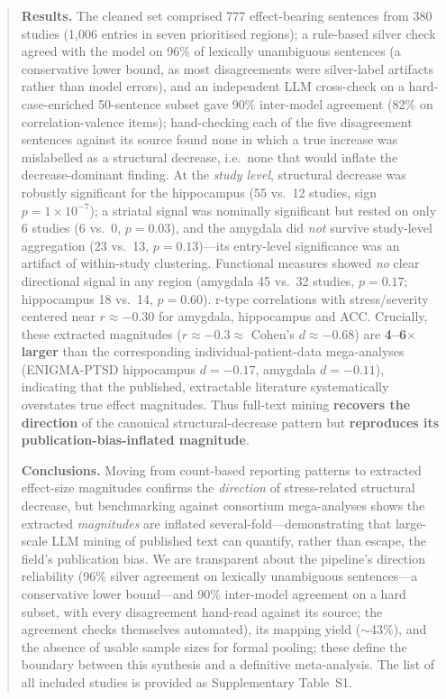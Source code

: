 \documentclass[11pt]{article}
\begin{document}
\begin{abstract}
\textbf{Results.} The cleaned set comprised 777 effect-bearing sentences from 380
studies (1{,}006 entries in seven prioritised regions); a rule-based silver check agreed with
the model on 96\% of lexically unambiguous sentences (a conservative lower bound,
as most disagreements were silver-label artifacts rather than model errors), and
an independent LLM cross-check on a hard-case-enriched 50-sentence subset gave
90\% inter-model agreement (82\% on correlation-valence items); hand-checking each
of the five disagreement sentences against its source found none in which a true
increase was mislabelled as a structural decrease, i.e.\ none that would inflate
the decrease-dominant finding. At the \emph{study level}, structural decrease was
robustly significant for the hippocampus (55 vs.\ 12 studies, sign
$p=1\times10^{-7}$); a striatal signal was nominally significant but rested on
only 6 studies (6 vs.\ 0, $p=0.03$), and the amygdala did \emph{not} survive
study-level aggregation (23 vs.\ 13, $p=0.13$)---its entry-level significance was
an artifact of within-study clustering. Functional measures showed \emph{no}
clear directional signal in any region (amygdala 45 vs.\ 32 studies, $p=0.17$;
hippocampus 18 vs.\ 14, $p=0.60$). r-type correlations with stress/severity
centered near $r\approx-0.30$ for amygdala, hippocampus and ACC. Crucially, these
extracted magnitudes ($r\approx-0.3 \approx$ Cohen's $d\approx-0.68$) are
\textbf{4--6$\times$ larger} than the corresponding individual-patient-data
mega-analyses (ENIGMA-PTSD hippocampus $d=-0.17$, amygdala $d=-0.11$), indicating
that the published, extractable literature systematically overstates true effect
magnitudes. Thus full-text mining \textbf{recovers the direction} of the
canonical structural-decrease pattern but \textbf{reproduces its
publication-bias-inflated magnitude}.

\textbf{Conclusions.} Moving from count-based reporting patterns to extracted
effect-size magnitudes confirms the \emph{direction} of stress-related structural
decrease, but benchmarking against consortium mega-analyses shows the extracted
\emph{magnitudes} are inflated several-fold---demonstrating that large-scale LLM
mining of published text can quantify, rather than escape, the field's
publication bias. We are transparent about the pipeline's direction reliability
(96\% silver agreement on lexically unambiguous sentences---a conservative lower
bound---and 90\% inter-model agreement on a hard subset, with every disagreement
hand-read against its source; the agreement checks themselves automated), its mapping yield ($\sim$43\%), and the absence
of usable sample sizes for formal pooling; these define the boundary between this
synthesis and a definitive meta-analysis. The list of all included studies is provided as
Supplementary Table~S1.
\end{abstract}
\end{document}
